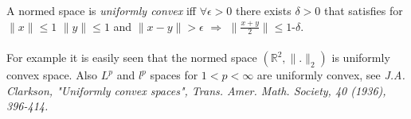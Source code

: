 \documentclass[12pt]{article}
\begin{document}
A normed space is \emph{uniformly convex} iff  $\forall \epsilon>0$ there exists $\delta>0$ that satisfies
for $\|x\|\leq1$  $\|y\|\leq1$ and $\|x-y\|> \epsilon$ $\Rightarrow$ $\|\frac{x+y}{2}\|\leq1$-$\delta$.
\\\\For example it is easily seen that the normed space $(\mathbb{R}^2,\|.\|_{2})$ is uniformly convex space.
Also $L^p$ and $l^p$ spaces for $1<p<\infty$ are uniformly convex, see \it{ J.A. Clarkson, "Uniformly convex spaces", Trans. Amer. Math. Society, 40 (1936), 396-414.}

\end{document}
